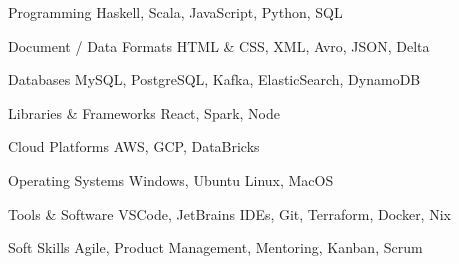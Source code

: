 


\begin{cvskills}


\cvskill
{Programming} %
{Haskell, Scala, JavaScript, Python, SQL} %


\cvskill
{Document / Data Formats} %
{HTML \& CSS, XML, Avro, JSON, Delta} %


\cvskill
{Databases} %
{MySQL, PostgreSQL, Kafka, ElasticSearch, DynamoDB} %



\cvskill
{Libraries \& Frameworks} %
{React, Spark, Node} %


\cvskill
{Cloud Platforms} %
{AWS, GCP, DataBricks} %


\cvskill
{Operating Systems} %
{Windows, Ubuntu Linux, MacOS} %


\cvskill
{Tools \& Software} %
{VSCode, JetBrains IDEs, Git, Terraform, Docker, Nix} %


\cvskill
{Soft Skills} %
{Agile, Product Management, Mentoring, Kanban, Scrum} %


\end{cvskills}